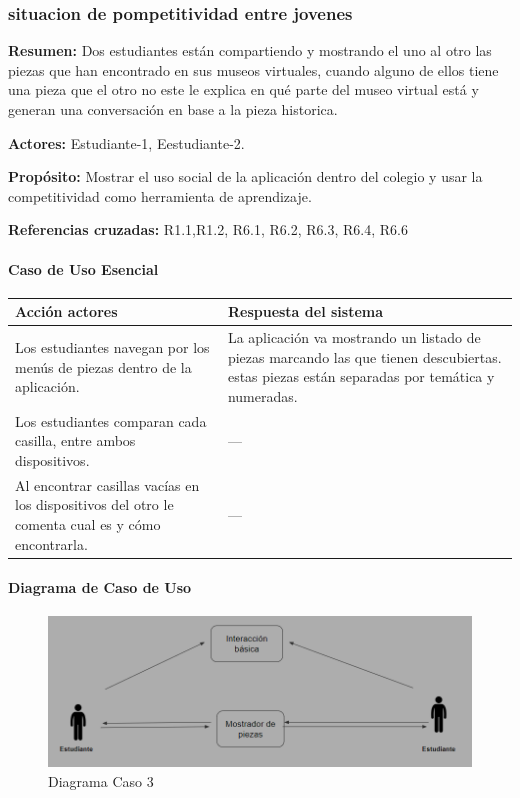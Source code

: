 \subsubsection{situacion de pompetitividad entre jovenes}

{\textbf {Resumen:}}
Dos estudiantes están compartiendo y mostrando el uno al otro las piezas que han encontrado en sus museos virtuales, cuando alguno de ellos tiene una pieza que el otro no este le explica en qué parte del museo virtual está y generan una conversación en base a la pieza historica.

{\textbf {Actores:}}
Estudiante-1, Eestudiante-2.

{\textbf {Propósito:}}
Mostrar el uso social de la aplicación dentro del colegio y usar la competitividad como herramienta de aprendizaje.

{\textbf {Referencias cruzadas:}}
R1.1,R1.2, R6.1, R6.2, R6.3, R6.4, R6.6

\paragraph{Caso de Uso Esencial}

\begin{longtable}{|p{5cm}|p{8cm}|}
\hline 
Acción actores & Respuesta del sistema \\ 
\hline 
Los estudiantes navegan por los menús de piezas dentro de la aplicación. & La aplicación va mostrando un listado de piezas marcando las que tienen descubiertas.
estas piezas están separadas por temática y numeradas.
 \\ 
\hline 
Los estudiantes comparan cada casilla, entre ambos dispositivos. & --- \\
\hline 
Al encontrar casillas vacías en los dispositivos del otro le comenta cual es y cómo encontrarla.  & --- \\
\hline 
\end{longtable}

\paragraph{Diagrama de Caso de Uso}

\begin{figure}[H]
\centerline{\includegraphics[width=15cm]{imgs/CasoUso_3.PNG}}
\caption{Diagrama Caso 3}
\label{fig_3_1}
\end{figure}

